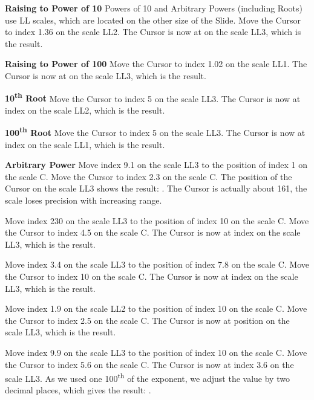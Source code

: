 \begin{multicols*}{3}
{  \textbf{Raising to Power of 10}
\footnotesize Powers of 10 and Arbitrary Powers (including Roots) use LL scales, which are located on the other size of the Slide. \normalsize
Move the Cursor to index 1.36 on the scale LL2.
The Cursor is now at  on the scale LL3, which is the result.

  \textbf{Raising to Power of 100}
Move the Cursor to index 1.02 on the scale LL1.
The Cursor is now at  on the scale LL3, which is the result.

  \textbf{10\textsuperscript{th} Root}
Move the Cursor to index 5 on the scale LL3.
The Cursor is now at index  on the scale LL2, which is the result.

  \textbf{100\textsuperscript{th} Root}
Move the Cursor to index 5 on the scale LL3.
The Cursor is now at index  on the scale LL1, which is the result.

  \textbf{Arbitrary Power}
Move index 9.1 on the scale LL3 to the position of index 1 on the scale C.
Move the Cursor to index 2.3 on the scale C.
The position of the Cursor on the scale LL3 shows the result: . The Cursor is actually about 161, the scale loses precision with increasing range. 

Move index 230 on the scale LL3 to the position of index 10 on the scale C.
Move the Cursor to index 4.5 on the scale C.
The Cursor is now at index  on the scale LL3, which is the result.

Move index 3.4 on the scale LL3 to the position of index 7.8 on the scale C.
Move the Cursor to index 10 on the scale C.
The Cursor is now at index  on the scale LL3, which is the result.

Move index 1.9 on the scale LL2 to the position of index 10 on the scale C.
Move the Cursor to index 2.5 on the scale C.
The Cursor is now at position  on the scale LL3, which is the result.

Move index 9.9 on the scale LL3 to the position of index 10 on the scale C.
Move the Cursor to index 5.6 on the scale C.
The Cursor is now at index 3.6 on the scale LL3.
As we used one 100\textsuperscript{th} of the exponent, we adjust the value by two decimal places, which gives the result: .

}
\end{multicols*}
